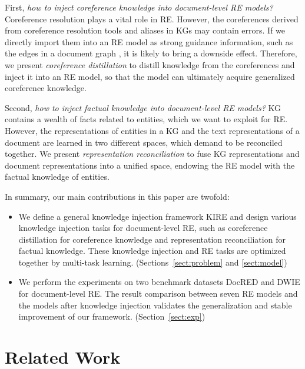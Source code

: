 \documentclass[runningheads]{llncs}
\begin{document}
First, \emph{how to inject coreference knowledge into document-level RE models?}
Coreference resolution plays a vital role in RE. 
However, the coreferences derived from coreference resolution tools and aliases in KGs may contain errors. 
If we directly import them into an RE model as strong guidance information, such as the edges in a document graph \cite{quirk2017distant}, it is likely to bring a downside effect. 
Therefore, we present \emph{coreference distillation} to distill knowledge from the coreferences and inject it into an RE model, so that the model can ultimately acquire generalized coreference knowledge.

Second, \emph{how to inject factual knowledge into document-level RE models?}
KG contains a wealth of facts related to entities, which we want to exploit for RE. 
However, the representations of entities in a KG and the text representations of a document are learned in two different spaces, which demand to be reconciled together. 
We present \emph{representation reconciliation} to fuse KG representations and document representations into a unified space, endowing the RE model with the factual knowledge of entities.

In summary, our main contributions in this paper are twofold:
\begin{itemize}
\item We define a general knowledge injection framework KIRE and design various knowledge injection tasks for document-level RE, such as coreference distillation for coreference knowledge and representation reconciliation for factual knowledge.
These knowledge injection and RE tasks are optimized together by multi-task learning. (Sections~\ref{sect:problem} and \ref{sect:model})

\item We perform the experiments on two benchmark datasets DocRED \cite{yao2019docred} and DWIE \cite{zaporojets2021dwie} for document-level RE.  
The result comparison between seven RE models and the models after knowledge injection validates the generalization and stable improvement of our framework. (Section~\ref{sect:exp})
\end{itemize}




\section{Related Work}
\label{sect:work}
\end{document}
